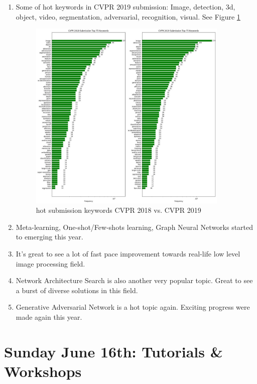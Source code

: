 \documentclass[11pt]{article}
\begin{document}
\begin{enumerate}
    \newpage
    \item Some of hot keywords in CVPR 2019 submission: Image, detection, 3d, object, video, segmentation, adversarial, recognition, visual. See Figure \ref{fig:Conf_HL3}
    \begin{figure}[ht!]
        \centering
        \includegraphics[width=0.9\textwidth]{images/Image3.jpeg}
        \caption{hot submission keywords CVPR 2018 vs. CVPR 2019}
        \label{fig:Conf_HL3}
    \end{figure}
    
    \item Meta-learning, One-shot/Few-shots learning, Graph Neural Networks started to emerging this year.
    \item It's great to see a lot of fast pace improvement towards real-life low level image processing field.
    \item Network Architecture Search is also another very popular topic. Great to see a burst of diverse solutions in this field.
    \item Generative Adversarial Network is a hot topic again. Exciting progress were made again this year.
\end{enumerate}{}

\newpage
\section{Sunday June 16th: Tutorials \& Workshops}

\end{document}
